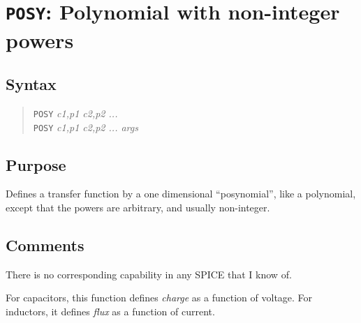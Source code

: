 %
%
%
%
\section{{\tt POSY}: Polynomial with non-integer powers}
\subsection{Syntax}
\begin{verse}
{\tt POSY} {\it c1,p1 c2,p2 ...}\\
{\tt POSY} {\it c1,p1 c2,p2 ... args}
\end{verse}
\subsection{Purpose}

Defines a transfer function by a one dimensional ``posynomial'', like
a polynomial, except that the powers are arbitrary, and usually non-integer.
\subsection{Comments}

There is no corresponding capability in any SPICE that I know of.

For capacitors, this function defines {\em charge} as a function of
voltage.  For inductors, it defines {\em flux} as a function of
current.

